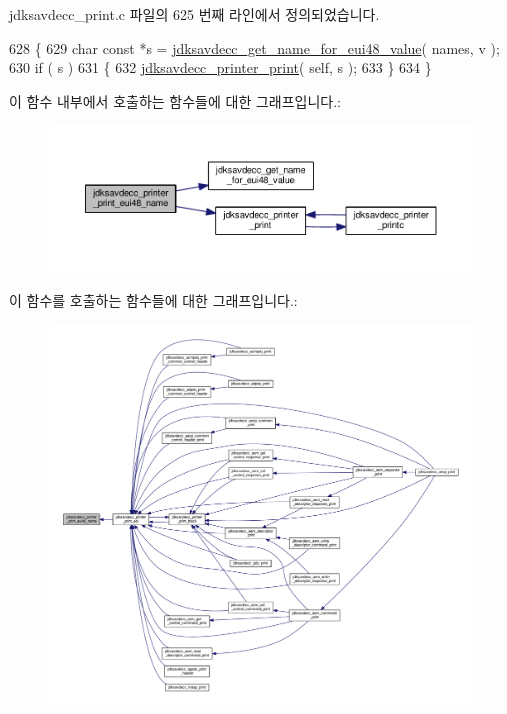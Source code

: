 jdksavdecc\+\_\+print.\+c 파일의 625 번째 라인에서 정의되었습니다.


\begin{DoxyCode}
628 \{
629     \textcolor{keywordtype}{char} \textcolor{keyword}{const} *s = \hyperlink{group__util_ga23aabc55d9c49940559695274381ebf7}{jdksavdecc\_get\_name\_for\_eui48\_value}( names, v );
630     \textcolor{keywordflow}{if} ( s )
631     \{
632         \hyperlink{group__util_ga335ac75e0aa3fe66501b752bf9d0f90d}{jdksavdecc\_printer\_print}( \textcolor{keyword}{self}, s );
633     \}
634 \}
\end{DoxyCode}


이 함수 내부에서 호출하는 함수들에 대한 그래프입니다.\+:
\nopagebreak
\begin{figure}[H]
\begin{center}
\leavevmode
\includegraphics[width=350pt]{group__util_ga3bed38ef44cf3b94cc27d97a4f9b7242_cgraph}
\end{center}
\end{figure}




이 함수를 호출하는 함수들에 대한 그래프입니다.\+:
\nopagebreak
\begin{figure}[H]
\begin{center}
\leavevmode
\includegraphics[width=350pt]{group__util_ga3bed38ef44cf3b94cc27d97a4f9b7242_icgraph}
\end{center}
\end{figure}


